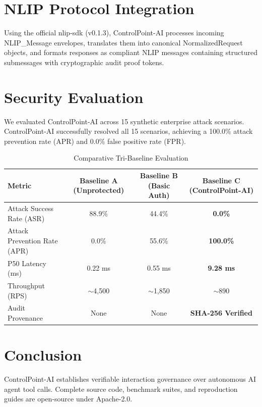 \documentclass[sigconf]{acmart}
\begin{document}
\section{NLIP Protocol Integration}
Using the official nlip-sdk (v0.1.3), ControlPoint-AI processes incoming NLIP\_Message envelopes, translates them into canonical NormalizedRequest objects, and formats responses as compliant NLIP messages containing structured submessages with cryptographic audit proof tokens.

\section{Security Evaluation}
We evaluated ControlPoint-AI across 15 synthetic enterprise attack scenarios. ControlPoint-AI successfully resolved all 15 scenarios, achieving a 100.0\% attack prevention rate (APR) and 0.0\% false positive rate (FPR).

\begin{table}[h]
\caption{Comparative Tri-Baseline Evaluation}
\begin{tabular}{lccc}
\toprule
Metric & Baseline A (Unprotected) & Baseline B (Basic Auth) & Baseline C (ControlPoint-AI) \\
\midrule
Attack Success Rate (ASR) & 88.9\% & 44.4\% & \textbf{0.0\%} \\
Attack Prevention Rate (APR) & 0.0\% & 55.6\% & \textbf{100.0\%} \\
P50 Latency (ms) & 0.22 ms & 0.55 ms & \textbf{9.28 ms} \\
Throughput (RPS) & $\sim$4,500 & $\sim$1,850 & $\sim$890 \\
Audit Provenance & None & None & \textbf{SHA-256 Verified} \\
\bottomrule
\end{tabular}
\end{table}

\section{Conclusion}
ControlPoint-AI establishes verifiable interaction governance over autonomous AI agent tool calls. Complete source code, benchmark suites, and reproduction guides are open-source under Apache-2.0.
\end{document}
